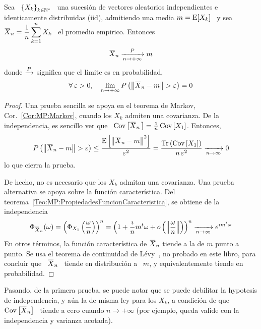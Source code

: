 \begin{teorema}
  Sea  \ $\left\{ X_k  \right\}_{k \in  \mathbb{N}^*}$ \  una sucesi\'on  de vectores
  aleatorios  independientes e identicamente  distribuidas (iid),  admitiendo una
  media  $m =  \operatorname{E}[X_k]$  \ y  sea  \ $\displaystyle  \widebar{X}_n =  \frac1n
  \sum_{k=1}^n X_k$ \ el promedio empirico. Entonces
  \[
  \widebar{X}_n \limitP{n \to +\infty} m
  \]
  donde $\xrightarrow[]{P}$ significa que el l\'imite es en probabilidad, \ie
  \[
  \forall  \:  \varepsilon  >0,  \quad  \lim_{n  \to  +\infty}  P\left(  \left\|
      \widebar{X}_n - m \right\| > \varepsilon \right) = 0
  \]
\end{teorema}
\begin{proof}
  Una    prueba    sencilla   se    apoya    en    el    teorema   de    Markov,
  Cor.~\ref{Cor:MP:Markov},  cuando  los $X_k$  admiten  una  covarianza. De  la
  independencia, es  sencillo ver que  \ $\Cov\left[ \widebar{X}_n \,  \right] =
  \frac1n \Cov\left[ X_1 \right]$. Entonces,
  \[
  P\left(  \left\|  \widebar{X}_n  -  m  \right\|  >  \varepsilon  \right)  \le
  \frac{\Esp\left[ \left\|  \widebar{X}_n - m\right\|^2 \right]}{\varepsilon^2}
  =  \frac{\Tr\left(   \Cov\left[  X_1  \right]   \right)}{n  \,  \varepsilon^2}
  \xrightarrow[n \to \infty]{} 0
  \]
  lo que cierra la prueba.

  De hecho,  no es necesario  que los $X_k$  admitan una covarianza.  Una prueba
  alternativa    se   apoya   sobre    la   funci\'on    caracter\'istica.   Del
  teorema~\ref{Teo:MP:PropiedadesFuncionCaracteristica},   se   obtiene  de   la
  independencia
  \[
  \Phi_{\widebar{X}_n}(\omega)   =  \left(   \Phi_{X_1}\left(  \frac{\omega}{n}
    \right) \right)^n = \left( 1 + \frac{\imath}{n} m^t \omega + o\left( \left\|
        \frac{\omega}{n} \right\| \right) \right)^n \xrightarrow[n \to \infty]{}
  e^{\imath m^t \omega}
  \]
  En otros t\'erminos, la funci\'on caracter\'istica de $\widebar{X}_n$ tiende a
  la   de  $m$   punto  a   punto.  Se   usa  el   teorema  de   continuidad  de
  L\'evy~\cite{AshDol99, AthLah06, Bil12, Coh13}, no probado en este libro, para
  concluir  que  \  $\widebar{X}_n$  \  tiende  en distribuci\'on  a  \  $m$,  y
  equivalentemente tiende en probabilidad.
\end{proof}
%
Pasando,  de  la primera  prueba,  se  puede notar  que  se  puede debilitar  la
hypotesis  de  independencia,  y  a\'un  la  de misma  ley  para  los  $X_k$,  a
condici\'on de que $\Cov\left[ \widebar{X}_n \right]$ \ tiende a cero cuando $n
\to +\infty$ (por ejemplo, queda valide con la independencia y varianza acotada).

